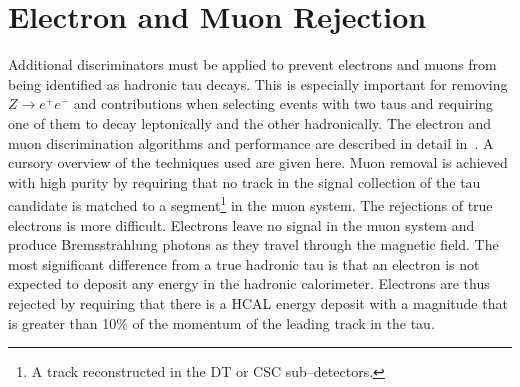 \section{Electron and Muon Rejection}
\label{sec:LightLeptonRejection} Additional discriminators must be applied to
prevent electrons and muons from being identified as hadronic tau decays.  This
is especially important for removing $Z\to e^+e^-$ and \ZMM contributions when
selecting events with two taus and requiring one of them to decay leptonically
and the other hadronically.  The electron and muon discrimination algorithms and
performance are described in detail in~\cite{CMS-PAS-PFT-08-001}.  A cursory
overview of the techniques used are given here.  Muon removal is achieved with
high purity by requiring that no track in the signal collection of the tau
candidate is matched to a segment\footnote{A track reconstructed in the DT or
CSC sub--detectors.} in the muon system.  The rejections of true electrons is
more difficult.  Electrons leave no signal in the muon system and produce
Bremsstrahlung photons as they travel through the magnetic field.  The most
significant difference from a true hadronic tau is that an electron is not
expected to deposit any energy in the hadronic calorimeter.  Electrons are thus
rejected by requiring that there is a HCAL energy deposit with a magnitude that
is greater than 10\% of the momentum of the leading track in the tau.

\ifx\master\undefined\fi
